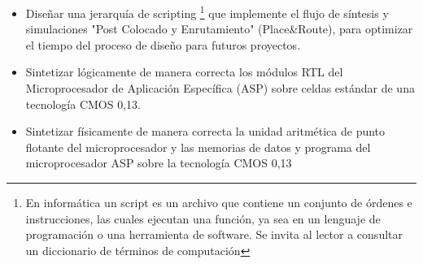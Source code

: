 \begin{itemize}

\item{Diseñar una jerarquía de scripting \footnote{En informática un script es un archivo que contiene un conjunto de órdenes e instrucciones, las cuales ejecutan una función, ya sea en un lenguaje de programación o una herramienta de software. Se invita al lector a consultar un diccionario de términos de computación} que implemente el flujo de síntesis y simulaciones {"Post Colocado y Enrutamiento"} (Place\&Route), para optimizar el tiempo del proceso de diseño para futuros proyectos.}

\item {Sintetizar lógicamente de manera correcta los módulos RTL del Microprocesador de Aplicación Específica (ASP) sobre celdas estándar de una tecnología CMOS 0,13.}

\item {Sintetizar físicamente de manera correcta la unidad aritmética de punto flotante del microprocesador y las memorias de datos y programa del microprocesador ASP sobre la tecnología CMOS 0,13}

\end{itemize}
